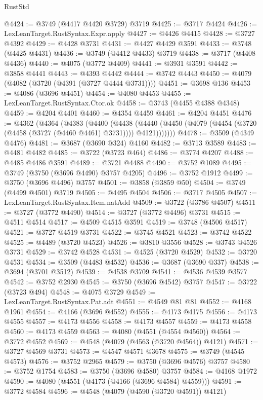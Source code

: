 \begin{lexlean}{RustStd}
\begin{coremodule}
@4424 := @3749 (@4417 @4420 @3729) @3719
@4425 := @3717 @4424
@4426 := LexLeanTarget.RustSyntax.Expr.apply
@4427 := @4426 @4415
@4428 := @3727 @4392
@4429 := @4428 @3731
@4431 := @4427 @4429 @3591
@4433 := @3748 (@4425 @4431)
@4436 := @3749 (@4412 @4433) @3719
@4438 := @3717 (@4408 @4436)
@4440 := @4075 (@3772 @4409)
@4441 := @3931 @3591
@4442 := @3858 @4441
@4443 := @4393 @4442
@4444 := @3742 @4443
@4450 := @4079 (@4082 (@3720 (@4391 (@3727 @4444 @3731))))
@4451 := @3698 @136
@4453 := @4086 (@3696 @4451)
@4454 := @4080 @4453
@4455 := LexLeanTarget.RustSyntax.Ctor.ok
@4458 := @3743 (@4455 @4388 @4348)
@4459 := @4204 @4401
@4460 := @4354 @4459
@4461 := @4204 @4451
@4476 := @4362
    (@4364
      (@4383
        (@4400
          (@4438
            (@4440 (@4450 (@4079 (@4454 (@3720 (@4458 (@3727 (@4460 @4461) @3731)))) @4121)))))))
@4478 := @3509 (@4349 @4476)
@4481 := @3687 (@3690 @324) @4160
@4482 := @3713 @3589
@4483 := @4481 @4482
@4485 := @3722 (@3723 @464)
@4486 := @3774 @4207
@4488 := @4485 @4486 @3591
@4489 := @3721 @4488
@4490 := @3752 @1089
@4495 := @3749 (@3750 (@3696 @4490) @3757 @4205)
@4496 := @3752 @1912
@4499 := @3750 (@3696 @4496) @3757
@4501 := @3858 (@3859 @50)
@4504 := @3749 (@4499 @4501) @3719
@4505 := @4495 @4504
@4506 := @3717 @4505
@4507 := LexLeanTarget.RustSyntax.Item.natAdd
@4509 := @3722 (@3786 @4507)
@4511 := @3727 (@3772 @4490)
@4514 := @3727 (@3772 @4496) @3731
@4515 := @4511 @4514
@4517 := @4509 @4515 @3591
@4519 := @3748 (@4506 @4517)
@4521 := @3727 @4519 @3731
@4522 := @3745 @4521
@4523 := @3742 @4522
@4525 := @4489 (@3720 @4523)
@4526 := @3810 @3556
@4528 := @3743 @4526 @3731
@4529 := @3742 @4528
@4531 := @4525 (@3720 @4529)
@4532 := @3720 @4531
@4534 := @3509 (@4483 @4532)
@4536 := @3687 (@3690 @337)
@4538 := @3694 (@3701 @3512)
@4539 := @4538 @3709
@4541 := @4536 @4539 @3577
@4542 := @3752 @2930
@4545 := @3750 (@3696 @4542) @3757
@4547 := @3722 (@3723 @494)
@4548 := @4075 @3729
@4549 := LexLeanTarget.RustSyntax.Pat.adt
@4551 := @4549 @81 @81
@4552 := @4168 @1961
@4554 := @4166 (@3696 @4552)
@4555 := @4173 @4175
@4556 := @4173 @4555
@4557 := @4173 @4556
@4558 := @4173 @4557
@4559 := @4173 @4558
@4560 := @4173 @4559
@4563 := @4080 (@4551 (@4554 @4560))
@4564 := @3772 @4552
@4569 := @4548 (@4079 (@4563 (@3720 @4564)) @4121)
@4571 := @3727 @4569 @3731
@4573 := @4547 @4571 @3678
@4575 := @3749 (@4545 @4573)
@4576 := @3752 @2965
@4579 := @3750 (@3696 @4576) @3757
@4580 := @3752 @1754
@4583 := @3750 (@3696 @4580) @3757
@4584 := @4168 @1972
@4590 := @4080 (@4551 (@4173 (@4166 (@3696 @4584) @4559)))
@4591 := @3772 @4584
@4596 := @4548 (@4079 (@4590 (@3720 @4591)) @4121)

\end{coremodule}
\end{lexlean}
